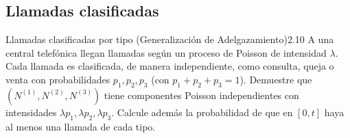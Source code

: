 \documentclass[10pt,a4paper]{article}
\begin{document}
\newpage
\subsection{Llamadas clasificadas}

\begin{ejercicio}{Llamadas clasificadas por tipo (Generalización de Adelgazamiento)}{2.10}
    A una central telefónica llegan llamadas según un proceso de Poisson de intensidad $\lambda$. Cada llamada es clasificada, de manera independiente, como consulta, queja o venta con probabilidades $p_1, p_2, p_3$ (con $p_1+p_2+p_3=1$). Demuestre que $(N^{(1)}, N^{(2)}, N^{(3)})$ tiene componentes Poisson independientes con intensidades $\lambda p_1, \lambda p_2, \lambda p_3$. Calcule además la probabilidad de que en $[0, t]$ haya al menos una llamada de cada tipo.
\end{ejercicio}
\end{document}
